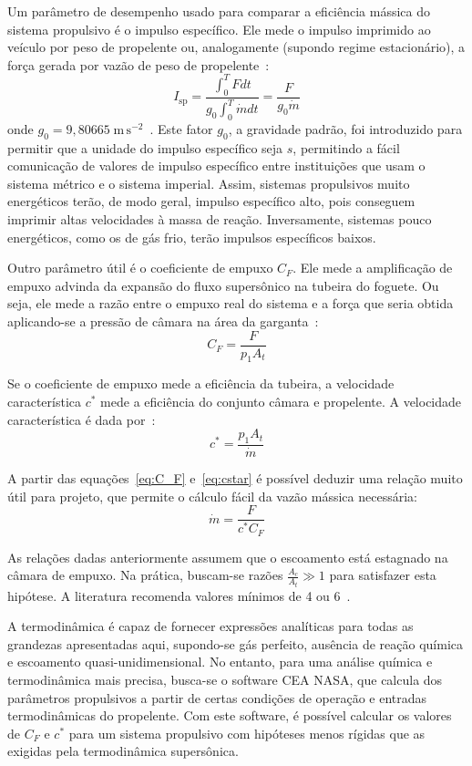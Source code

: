 Um parâmetro de desempenho usado para comparar a eficiência mássica do sistema propulsivo é o impulso específico. Ele mede o impulso imprimido ao veículo por peso de propelente ou, analogamente (supondo regime estacionário), a força gerada por vazão de peso de propelente~\cite{Sutton}:
\begin{equation}
    \label{eq:Isp}
    I_{\text{sp}} = \frac{\int^T_0 F dt}{g_0 \int^T_0 \dot{m}dt} = \frac{F}{g_0 \dot{m}}
\end{equation}
onde \(g_0=9,80665\;\mathrm{m}\,\mathrm{s}^{-2}\)~\cite{CGPM}. Este fator \(g_0\), a gravidade padrão, foi introduzido para permitir que a unidade do impulso específico seja \(s\), permitindo a fácil comunicação de valores de impulso específico entre instituições que usam o sistema métrico e o sistema imperial. Assim, sistemas propulsivos muito energéticos terão, de modo geral, impulso específico alto, pois conseguem imprimir altas velocidades à massa de reação. Inversamente, sistemas pouco energéticos, como os de gás frio, terão impulsos específicos baixos.

Outro parâmetro útil é o coeficiente de empuxo \(C_F\). Ele mede a amplificação de empuxo advinda da expansão do fluxo supersônico na tubeira do foguete. Ou seja, ele mede a razão entre o empuxo real do sistema e a força que seria obtida aplicando-se a pressão de câmara na área da garganta~\cite{Sutton}:
\begin{equation}
    \label{eq:C_F}
    C_F = \frac{F}{p_1 A_t}
\end{equation}

Se o coeficiente de empuxo mede a eficiência da tubeira, a velocidade característica \(c^*\) mede a eficiência do conjunto câmara e propelente. A velocidade característica é dada por~\cite{Sutton}:
\begin{equation}
    \label{eq:cstar}
    c^* = \frac{p_1 A_t}{\dot{m}}
\end{equation}

A partir das equações~\ref{eq:C_F} e~\ref{eq:cstar} é possível deduzir uma relação muito útil para projeto, que permite o cálculo fácil da vazão mássica necessária:
\begin{equation}
    \label{eq:mdot}
    \dot{m} = \frac{F}{c^* C_F}
\end{equation}

As relações dadas anteriormente assumem que o escoamento está estagnado na câmara de empuxo. Na prática, buscam-se razões \(\frac{A_c}{A_t} \gg 1\) para satisfazer esta hipótese. A literatura recomenda valores mínimos de 4 ou 6~\cite{Sutton}.

A termodinâmica é capaz de fornecer expressões analíticas para todas as grandezas apresentadas aqui, supondo-se gás perfeito, ausência de reação química e escoamento quasi-unidimensional. No entanto, para uma análise química e termodinâmica mais precisa, busca-se o software CEA NASA, que calcula dos parâmetros propulsivos a partir de certas condições de operação e entradas termodinâmicas do propelente. Com este software, é possível calcular os valores de \(C_F\) e \(c^*\) para um sistema propulsivo com hipóteses menos rígidas que as exigidas pela termodinâmica supersônica. 